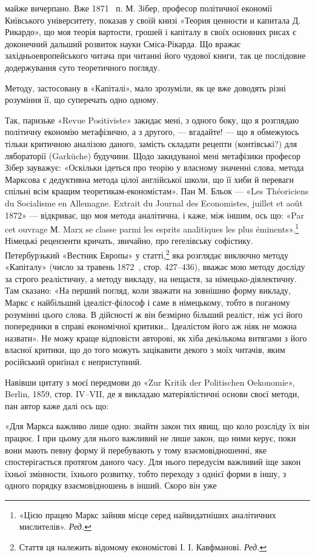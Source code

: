 \parcont{}  %
майже вичерпано. Вже 1871~ п. М. Зібер, професор політичної
економії Київського університету, показав у своїй книзі «Теория
ценности и капитала Д. Рикардо», що моя теорія вартости, грошей
і капіталу в своїх основних рисах є доконечний дальший
розвиток науки Сміса-Рікарда. Що вражає західньоевропейського
читача при читанні його чудової книги, так це послідовне
додержування суто теоретичного погляду.

Методу, застосовану в «Капіталі», мало зрозуміли, як це вже
доводять різні розуміння її, що суперечать одно одному.

Так, паризьке «Revue Positiviste» закидає мені, з одного боку,
що я розглядаю політичну економію метафізично, а з другого, —
вгадайте! — що я обмежуюсь тільки критичною аналізою даного,
замість складати рецепти (контівські?) для лябораторії (Garküche)
будучини. Щодо закидуваної мені метафізики професор Зібер зауважує:
«Оскільки ідеться про теорію у власному значенні слова,
метода Марксова є дедуктивна метода цілої англійської школи,
що її хиби й переваги спільні всім кращим теоретикам-економістам».
Пан М. Бльок — «Les Théoriciens du Socialisme en Allemagne.
Extrait du Journal des Economistes, juillet et août 1872» —
відкриває, що моя метода аналітична, і каже, між іншим, ось що:
«Par cet ouvrage М. Marx se classe parmi les esprits analitiques les
plus éminents».\footnote*{
«Цією працею Маркс зайняв місце серед найвидатніших аналітичних
мислителів». \emph{Ред.}
} Німецькі рецензенти кричать, звичайно, про
геґелівську софістику. Петербурзький «Вестник Европы» у
статті,\footnote*{
Стаття ця належить відомому економістові І. І. Кавфманові. \emph{Ред.}
} яка розглядає виключно методу «Капіталу» (число за
травень 1872~, стор. 427--436), вважає мою методу досліду за
строго реалістичну, а методу викладу, на нещастя, за німецько-діялектичну.
Там сказано: «На перший погляд, коли зважати на
зовнішню форму викладу, Маркс є найбільший ідеаліст-філософ
і саме в німецькому, тобто в поганому розумінні цього слова.
В дійсності ж він безмірно більший реаліст, ніж усі його попередники
в справі економічної критики\dots{} Ідеалістом його аж ніяк не
можна назвати». Не можу краще відповісти авторові, як хіба
декількома витягами з його власної критики, що до того можуть
зацікавити декого з моїх читачів, яким російський ориґінал є
неприступний.

Навівши цитату з моєї передмови до «\textgerman{Zur Kritik der Politischen
Oekonomie}», Berlin, 1859, стор. IV--VII, де я викладаю
матеріялістичні основи своєї методи, пан автор каже далі ось що:

«Для Маркса важливо лише одно: знайти закон тих явищ, що
коло розсліду їх він працює. І при цьому для нього важливий не
лише закон, що ними керує, поки вони мають певну форму й перебувають
у тому взаємовідношенні, яке спостерігається протягом
даного часу. Для нього передусім важливий іще закон їхньої
змінности, їхнього розвитку, тобто переходу з однієї форми в
іншу, з одного порядку взаємовідношень в інший. Скоро він уже
\parbreak{}  %
